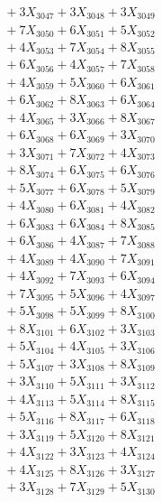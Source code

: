 \documentclass[a4paper,10pt]{article}
\begin{document}
{\begin{align}
&\;  + 3 X_{3047} + 3 X_{3048} + 3 X_{3049} \\[0.3ex]
&\;  + 7 X_{3050} + 6 X_{3051} + 5 X_{3052} \\[0.3ex]
&\;  + 4 X_{3053} + 7 X_{3054} + 8 X_{3055} \\[0.3ex]
&\;  + 6 X_{3056} + 4 X_{3057} + 7 X_{3058} \\[0.3ex]
&\;  + 4 X_{3059} + 5 X_{3060} + 6 X_{3061} \\[0.3ex]
&\;  + 6 X_{3062} + 8 X_{3063} + 6 X_{3064} \\[0.3ex]
&\;  + 4 X_{3065} + 3 X_{3066} + 8 X_{3067} \\[0.3ex]
&\;  + 6 X_{3068} + 6 X_{3069} + 3 X_{3070} \\[0.5ex]\allowbreak
&\;  + 3 X_{3071} + 7 X_{3072} + 4 X_{3073} \\[0.3ex]
&\;  + 8 X_{3074} + 6 X_{3075} + 6 X_{3076} \\[0.3ex]
&\;  + 5 X_{3077} + 6 X_{3078} + 5 X_{3079} \\[0.3ex]
&\;  + 4 X_{3080} + 6 X_{3081} + 4 X_{3082} \\[0.3ex]
&\;  + 6 X_{3083} + 6 X_{3084} + 8 X_{3085} \\[0.3ex]
&\;  + 6 X_{3086} + 4 X_{3087} + 7 X_{3088} \\[0.3ex]
&\;  + 4 X_{3089} + 4 X_{3090} + 7 X_{3091} \\[0.3ex]
&\;  + 4 X_{3092} + 7 X_{3093} + 6 X_{3094} \\[0.3ex]
&\;  + 7 X_{3095} + 5 X_{3096} + 4 X_{3097} \\[0.3ex]
&\;  + 5 X_{3098} + 5 X_{3099} + 8 X_{3100} \\[0.5ex]\allowbreak
&\;  + 8 X_{3101} + 6 X_{3102} + 3 X_{3103} \\[0.3ex]
&\;  + 5 X_{3104} + 4 X_{3105} + 3 X_{3106} \\[0.3ex]
&\;  + 5 X_{3107} + 3 X_{3108} + 8 X_{3109} \\[0.3ex]
&\;  + 3 X_{3110} + 5 X_{3111} + 3 X_{3112} \\[0.3ex]
&\;  + 4 X_{3113} + 5 X_{3114} + 8 X_{3115} \\[0.3ex]
&\;  + 5 X_{3116} + 8 X_{3117} + 6 X_{3118} \\[0.3ex]
&\;  + 3 X_{3119} + 5 X_{3120} + 8 X_{3121} \\[0.3ex]
&\;  + 4 X_{3122} + 3 X_{3123} + 4 X_{3124} \\[0.3ex]
&\;  + 4 X_{3125} + 8 X_{3126} + 3 X_{3127} \\[0.3ex]
&\;  + 3 X_{3128} + 7 X_{3129} + 5 X_{3130} \\[0.5ex]\allowbreak

\end{align}}
\end{document}
